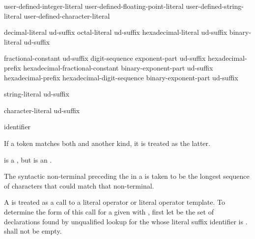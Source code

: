 %
\begin{bnf}
\br
    user-defined-integer-literal\br
    user-defined-floating-point-literal\br
    user-defined-string-literal\br
    user-defined-character-literal
\end{bnf}

\begin{bnf}
\br
    decimal-literal ud-suffix\br
    octal-literal ud-suffix\br
    hexadecimal-literal ud-suffix\br
    binary-literal ud-suffix
\end{bnf}

\begin{bnf}
\br
    fractional-constant  ud-suffix\br
    digit-sequence exponent-part ud-suffix\br
    hexadecimal-prefix hexadecimal-fractional-constant binary-exponent-part ud-suffix\br
    hexadecimal-prefix hexadecimal-digit-sequence binary-exponent-part ud-suffix
\end{bnf}

\begin{bnf}
\br
    string-literal ud-suffix
\end{bnf}

\begin{bnf}
\br
    character-literal ud-suffix
\end{bnf}

\begin{bnf}
\br
    identifier
\end{bnf}

\pnum
If a token matches both  and another  kind, it
is treated as the latter.
\begin{example}
is a , but  is an
.
\end{example}
The syntactic non-terminal preceding the  in a
 is taken to be the longest sequence of
characters that could match that non-terminal.

\pnum
A  is treated as a call to a literal operator or
literal operator template.
To determine the form of this call for
a given  
with  ,
first let  be the set of declarations
found by unqualified lookup for the 
whose literal suffix identifier is .
 shall not be empty.


